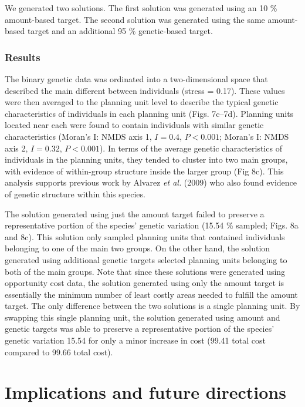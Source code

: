\documentclass[11pt,]{article}
\begin{document}
We generated two solutions. The first solution was generated using an 10
\% amount-based target. The second solution was generated using the same
amount-based target and an additional 95 \% genetic-based target.

\subsubsection{Results}\label{results-2}

The binary genetic data was ordinated into a two-dimensional space that
described the main different between individuals (stress = 0.17). These
values were then averaged to the planning unit level to describe the
typical genetic characteristics of individuals in each planning unit
(Figs. 7c--7d). Planning units located near each were found to contain
individuals with similar genetic characteristics (Moran's I: NMDS axis
1, $I = 0.4$, $P < 0.001$; Moran's I: NMDS axis 2, $I = 0.32$,
$P < 0.001$). In terms of the average genetic characteristics of
individuals in the planning units, they tended to cluster into two main
groups, with evidence of within-group structure inside the larger group
(Fig 8c). This analysis supports previous work by Alvarez \emph{et al.}
(2009) who also found evidence of genetic structure within this species.

The solution generated using just the amount target failed to preserve a
representative portion of the species' genetic variation (15.54 \%
sampled; Figs. 8a and 8c). This solution only sampled planning units
that contained individuals belonging to one of the main two groups. On
the other hand, the solution generated using additional genetic targets
selected planning units belonging to both of the main groups. Note that
since these solutions were generated using opportunity cost data, the
solution generated using only the amount target is essentially the
minimum number of least costly areas needed to fulfill the amount
target. The only difference between the two solutions is a single
planning unit. By swapping this single planning unit, the solution
generated using amount and genetic targets was able to preserve a
representative portion of the species' genetic variation 15.54 for only
a minor increase in cost (99.41 total cost compared to 99.66 total
cost).

\section{Implications and future
directions}\label{implications-and-future-directions}
\end{document}
